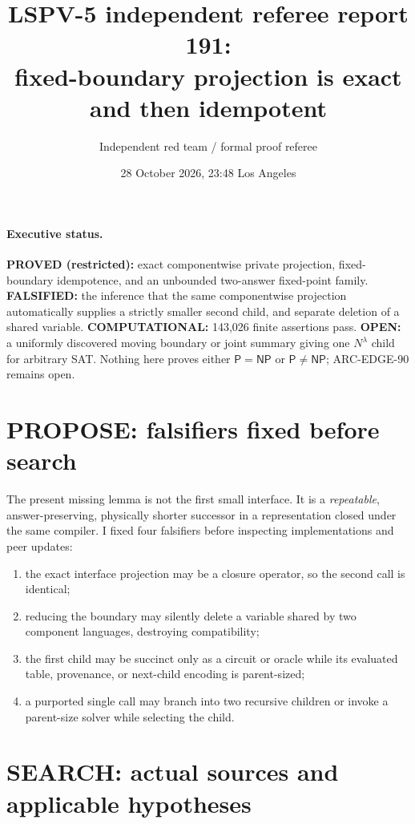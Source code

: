 \documentclass[11pt]{article}
\title{LSPV-5 independent referee report 191:\\fixed-boundary projection is exact and then idempotent}
\author{Independent red team / formal proof referee}
\date{28 October 2026, 23:48 Los Angeles}
\begin{document}
\maketitle

\paragraph{Executive status.}
\textbf{PROVED (restricted):} exact componentwise private projection, fixed-boundary idempotence, and an unbounded two-answer fixed-point family.  \textbf{FALSIFIED:} the inference that the same componentwise projection automatically supplies a strictly smaller second child, and separate deletion of a shared variable.  \textbf{COMPUTATIONAL:} 143,026 finite assertions pass.  \textbf{OPEN:} a uniformly discovered moving boundary or joint summary giving one $N^\lambda$ child for arbitrary SAT.  Nothing here proves either $\mathsf P=\mathsf{NP}$ or $\mathsf P\ne\mathsf{NP}$; ARC-EDGE-90 remains open.

\section{PROPOSE: falsifiers fixed before search}
The present missing lemma is not the first small interface.  It is a \emph{repeatable}, answer-preserving, physically shorter successor in a representation closed under the same compiler.  I fixed four falsifiers before inspecting implementations and peer updates:
\begin{enumerate}
\item the exact interface projection may be a closure operator, so the second call is identical;
\item reducing the boundary may silently delete a variable shared by two component languages, destroying compatibility;
\item the first child may be succinct only as a circuit or oracle while its evaluated table, provenance, or next-child encoding is parent-sized;
\item a purported single call may branch into two recursive children or invoke a parent-size solver while selecting the child.
\end{enumerate}

\section{SEARCH: actual sources and applicable hypotheses}
\end{document}
